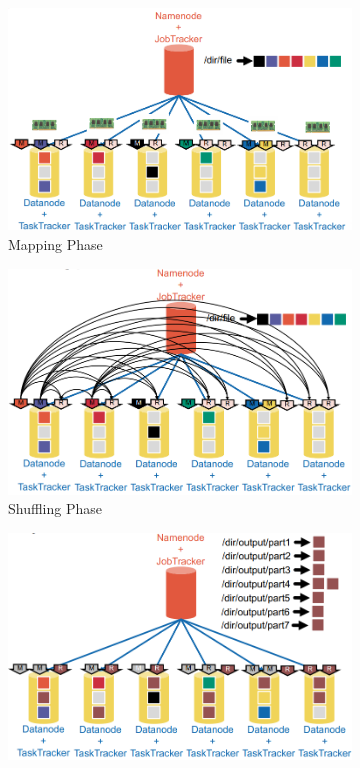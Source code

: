 \documentclass[11pt,oneside,a4paper]{article}
\begin{document}
\begin{figure}[t!]
	\centering
	\begin{subfigure}[t]{.3\textwidth}
		\centering
		\includegraphics[width=1\linewidth]{figures/mr_mapping_phase}
		\caption{Mapping Phase}
		\label{fig:mrmappingphase}
	\end{subfigure}%
	\begin{subfigure}[t]{.3\textwidth}
		\centering
		\includegraphics[width=1\linewidth]{figures/mr_shuffling_phase}
		\caption{Shuffling Phase}
		\label{fig:mrshufflingphase}
	\end{subfigure}
	\begin{subfigure}[t]{.3\textwidth}
		\centering
		\includegraphics[width=1\linewidth]{figures/mr_reduce_phase}

\end{subfigure}
\end{figure}
\end{document}
